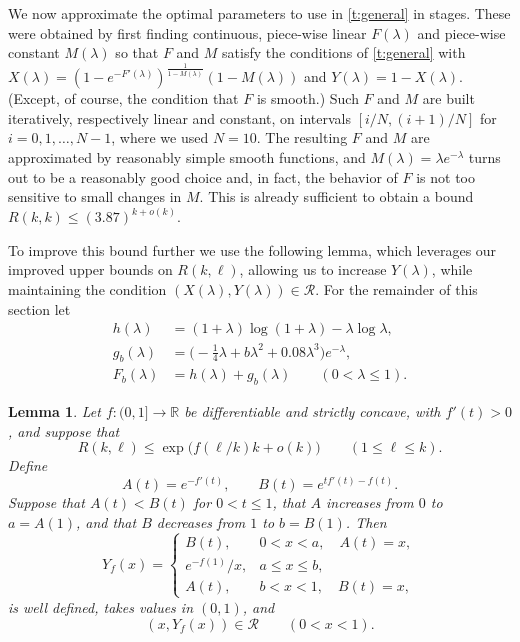 \documentclass[reqno,final,12pt]{amsart}
\newtheorem{lem}[thm]{Lemma}
\newcommand{\mc}[1]{\mathcal{#1}}
\begin{document}
We now approximate the optimal parameters to use in \cref{t:general} in stages. These were obtained by first finding continuous, piece-wise linear $F(\lambda)$ and piece-wise constant $M(\lambda)$ so that $F$ and $M$ satisfy the conditions of \cref{t:general} with $X(\lambda)= (1 - e^{-F'(\lambda)})^{\frac{1}{1-M(\lambda)}}(1-M(\lambda))$ and $Y(\lambda)=1-X(\lambda)$. (Except, of course, the condition that $F$ is smooth.)
Such $F$ and $M$  are built iteratively, respectively linear and constant, on intervals $[i/N,(i+1)/N]$ for $i=0,1,\ldots, N-1$, where we used $N=10$. The resulting $F$ and $M$ are approximated by reasonably simple smooth functions, and $M(\lambda)= \lambda  e^{-\lambda}$ turns out to be a reasonably good choice and, in fact, the behavior of $F$ is not too sensitive to small changes in $M$. This is already sufficient to obtain a bound $R(k,k) \leq (3.87)^{k+o(k)}$.

To improve this bound further we use the following lemma, which leverages our improved upper bounds on $R(k, \ell)$, allowing us to increase $Y(\lambda)$, while maintaining the condition $(X(\lambda),Y(\lambda)) \in \mc{R}$.  %
For the remainder of this section let
\begin{align*}
	h(\lambda)&=(1+\lambda)\log(1+\lambda)-\lambda\log\lambda,\\
	g_b(\lambda)&=\bigl(-\tfrac14\lambda+b\lambda^2
	+0.08\lambda^3\bigr)e^{-\lambda},\\
	F_b(\lambda)&=h(\lambda)+g_b(\lambda)
	\qquad (0<\lambda\leq 1).
\end{align*}

\begin{lem}\label{lem:frontier}
	Let $f\colon(0,1]\to\mathbb R$ be differentiable and strictly concave,
	with $f'(t)>0$, and suppose that
	\begin{equation}\label{eq:f-bound}
		R(k,\ell)\leq \exp\bigl(f(\ell/k)k+o(k)\bigr)
		\qquad (1\leq \ell\leq k).
	\end{equation}
	Define
	\[
	A(t)=e^{-f'(t)},\qquad B(t)=e^{tf'(t)-f(t)}.
	\]
	Suppose that $A(t)<B(t)$ for $0<t\leq1$, that $A$ increases from $0$ to
	$a=A(1)$, and that $B$ decreases from $1$ to $b=B(1)$.  Then
	\begin{equation}\label{eq:frontier}
		Y_f(x)=
		\begin{cases}
			B(t),&0<x<a,\quad A(t)=x,\\[1mm]
			e^{-f(1)}/x,&a\leq x\leq b,\\[1mm]
			A(t),&b<x<1,\quad B(t)=x,
		\end{cases}
	\end{equation}
	is well defined, takes values in $(0,1)$, and
	\[
	(x,Y_f(x))\in\mc{R}
	\qquad (0<x<1).
	\]
\end{lem}
\end{document}
